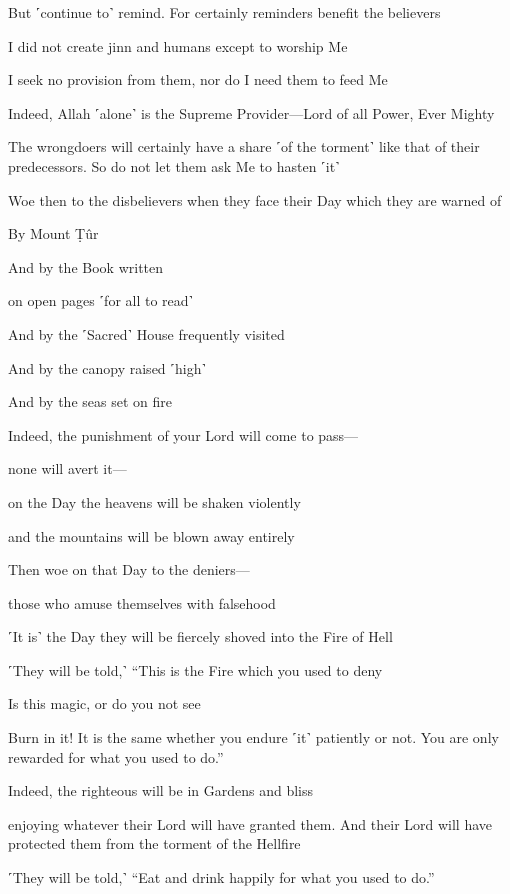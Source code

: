 But ˹continue to˺ remind. For certainly reminders benefit the believers

I did not create jinn and humans except to worship Me

I seek no provision from them, nor do I need them to feed Me

Indeed, Allah ˹alone˺ is the Supreme Provider—Lord of all Power, Ever Mighty

The wrongdoers will certainly have a share ˹of the torment˺ like that of their predecessors. So do not let them ask Me to hasten ˹it˺

Woe then to the disbelievers when they face their Day which they are warned of

By Mount Ṭûr

And by the Book written

on open pages ˹for all to read˺

And by the ˹Sacred˺ House frequently visited

And by the canopy raised ˹high˺

And by the seas set on fire

Indeed, the punishment of your Lord will come to pass—

none will avert it—

on the Day the heavens will be shaken violently

and the mountains will be blown away entirely

Then woe on that Day to the deniers—

those who amuse themselves with falsehood

˹It is˺ the Day they will be fiercely shoved into the Fire of Hell

˹They will be told,˺ “This is the Fire which you used to deny

Is this magic, or do you not see

Burn in it! It is the same whether you endure ˹it˺ patiently or not. You are only rewarded for what you used to do.”

Indeed, the righteous will be in Gardens and bliss

enjoying whatever their Lord will have granted them. And their Lord will have protected them from the torment of the Hellfire

˹They will be told,˺ “Eat and drink happily for what you used to do.”

